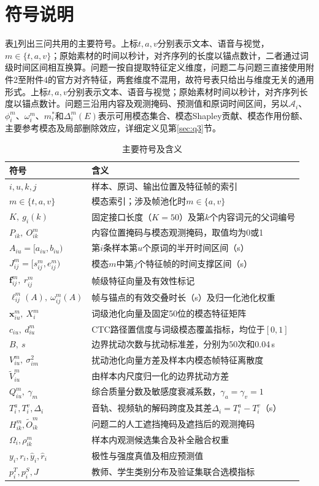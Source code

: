 \section{符号说明}
表\ref{tab:notations}列出三问共用的主要符号。上标$t,a,v$分别表示文本、语音与视觉，$m\in\{t,a,v\}$；原始素材的时间以秒计，对齐序列的长度以锚点数计，二者通过词级时间区间相互换算。问题一按自提取特征定义维度，问题二与问题三直接使用附件2至附件4的官方对齐特征，两套维度不混用，故符号表只给出与维度无关的通用形式。上标$t,a,v$分别表示文本、语音与视觉；原始素材时间以秒计，对齐序列长度以锚点数计。问题三沿用内容及观测掩码、预测值和原词时间区间，另以$\mathcal A_i$、$\phi_i^m$、$\omega_i^m$、$m_i^*$和$\Delta_i^m(E)$表示可用模态集合、模态Shapley贡献、模态作用份额、主要参考模态及局部删除效应，详细定义见第\ref{sec:q3}节。
\begin{table}[htbp]
\centering
\caption{主要符号及含义}
\label{tab:notations}
\begin{tabularx}{\linewidth}{p{3.5cm}X}
\toprule
符号 & 含义 \\
\midrule
$i,u,k,j$ & 样本、原词、输出位置及特征帧的索引 \\
$m\in\{t,a,v\}$ & 模态索引；涉及帧池化时$m\in\{a,v\}$ \\
$K,\ g_i(k)$ & 固定接口长度（$K=50$）及第$k$个内容词元的父词编号 \\
$P_{ik},\ O^m_{ik}$ & 内容位置掩码与模态观测掩码，取值均为0或1 \\
$A_{iu}=[a_{iu},b_{iu})$ & 第$i$条样本第$u$个原词的半开时间区间（s） \\
$J^m_{ij}=[s^m_{ij},e^m_{ij})$ & 模态$m$中第$j$个特征帧的时间支撑区间（s） \\
$\bm f^m_{ij},\ r^m_{ij}$ & 帧级特征向量及有效性标记 \\
$\ell^m_{ij}(A),\ \omega^m_{ij}(A)$ & 帧与锚点的有效交叠时长（s）及归一化池化权重 \\
$\bm x^m_{iu},\ X^m_i$ & 词级池化向量及固定50位的模态特征矩阵 \\
$c_{iu},\ d^m_{iu}$ & CTC路径置信度与词级模态覆盖指标，均位于$[0,1]$ \\
$B,\ s$ & 边界扰动次数与扰动标准差，分别为50次和0.04\,s \\
$V^m_{iu},\ \sigma_{im}^2$ & 扰动池化向量方差及样本内模态帧特征离散度 \\
$\widetilde V^m_{iu}$ & 由样本内尺度归一化的边界扰动方差 \\
$Q^m_{iu},\ \gamma_m$ & 综合质量分数及敏感度衰减系数，$\gamma_a=\gamma_v=1$ \\
$T_i^a,T_i^v,\Delta_i$ & 音轨、视频轨的解码跨度及其差$\Delta_i=T_i^a-T_i^v$（s） \\
$H^m_{ik},\widetilde O^m_{ik}$ & 问题二的人工遮挡掩码及遮挡后的观测掩码 \\
$\Omega_i,\rho^m_{ik}$ & 样本内观测候选集合及补全融合权重 \\
$y_i,r_i,\hat y_i,\hat r_i$ & 极性与强度真值及相应预测值 \\
$p_i^T,p_i^S,J$ & 教师、学生类别分布及验证集联合选模指标 \\
\bottomrule
\end{tabularx}
\end{table}
\FloatBarrier

